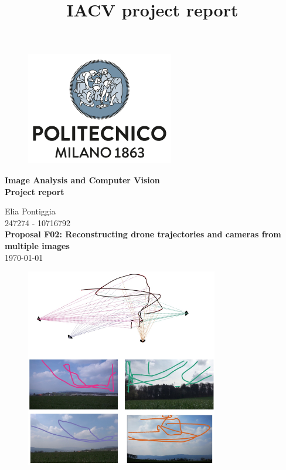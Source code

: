 \documentclass[11pt]{article}
\title{IACV project report}
\begin{document}
\begin{figure}[H]
    \centering
    \includegraphics[scale=0.4]{polimi.png}
\end{figure}


\begin{center}
    {\Large \textbf{Image Analysis and Computer Vision}}\\
    \vspace{2mm}
    {\Large \textbf{Project report}}\\
    \vspace{2mm}

    {\large Elia Pontiggia}\\
    \vspace{2mm}
    {247274 - 10716792}\\

    \vspace{5mm}
    {\Large \textbf{Proposal F02: Reconstructing drone trajectories and cameras from multiple images}}\\
    \vspace{3mm}
    \today
\end{center}
\vspace{5mm}

\begin{figure}[H]
    \centering
    \includegraphics[width=0.75\textwidth]{imgs/cover.jpg}
\end{figure}
\end{document}
